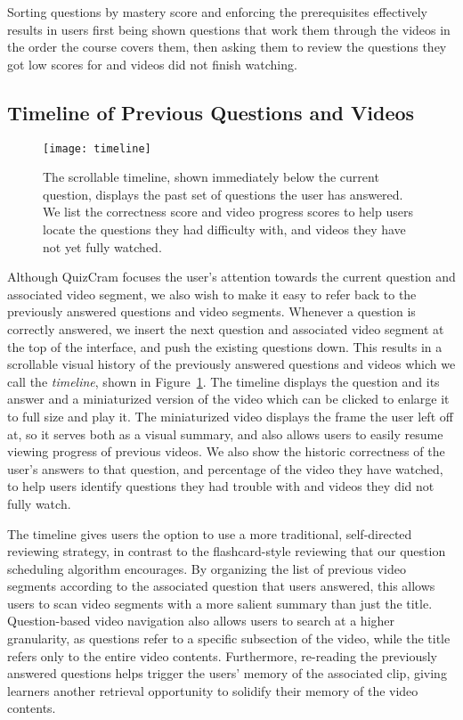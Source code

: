 \documentclass{chi-ext}
\begin{document}
Sorting questions by mastery score and enforcing the prerequisites effectively results in users first being shown questions that work them through the videos in the order the course covers them, then asking them to review the questions they got low scores for and videos did not finish watching.

\subsection{Timeline of Previous Questions and Videos}

\begin{figure}
\centering
\texttt{[image: timeline]}
\caption{The scrollable timeline, shown immediately below the current question, displays the past set of questions the user has answered. We list the correctness score and video progress scores to help users locate the questions they had difficulty with, and videos they have not yet fully watched.}
\label{fig:figure3}
\end{figure}

Although QuizCram focuses the user's attention towards the current question and associated video segment, we also wish to make it easy to refer back to the previously answered questions and video segments. Whenever a question is correctly answered, we insert the next question and associated video segment at the top of the interface, and push the existing questions down. This results in a scrollable visual history of the previously answered questions and videos which we call the \emph{timeline}, shown in Figure~\ref{fig:figure3}. The timeline displays the question and its answer and a miniaturized version of the video which can be clicked to enlarge it to full size and play it. The miniaturized video displays the frame the user left off at, so it serves both as a visual summary, and also allows users to easily resume viewing progress of previous videos. We also show the historic correctness of the user's answers to that question, and percentage of the video they have watched, to help users identify questions they had trouble with and videos they did not fully watch.

The timeline gives users the option to use a more traditional, self-directed reviewing strategy, in contrast to the flashcard-style reviewing that our question scheduling algorithm encourages. By organizing the list of previous video segments according to the associated question that users answered, this allows users to scan video segments with a more salient summary than just the title. Question-based video navigation also allows users to search at a higher granularity, as questions refer to a specific subsection of the video, while the title refers only to the entire video contents. Furthermore, re-reading the previously answered questions helps trigger the users' memory of the associated clip, giving learners another retrieval opportunity to solidify their memory of the video contents.
\end{document}
